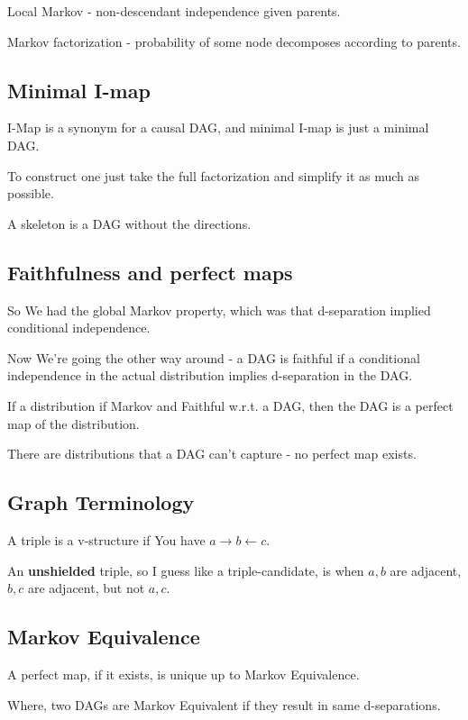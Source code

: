\documentclass{article}
\begin{document}
		Local Markov - non-descendant independence given parents.
		
		Markov factorization - probability of some node decomposes according to parents.
		
	\subsection{Minimal I-map}
	
		I-Map is a synonym for a causal DAG, and minimal I-map is just a minimal DAG.
		
		To construct one just take the full factorization and simplify it as much as possible.
		
		A skeleton is a DAG without the directions.
		
	\subsection{Faithfulness and perfect maps}
	
		So We had the global Markov property, which was that d-separation implied conditional independence.
		
		Now We're going the other way around - a DAG is faithful if a conditional independence in the actual distribution implies d-separation in the DAG.
		
		If a distribution if Markov and Faithful w.r.t. a DAG, then the DAG is a perfect map of the distribution.
		
		There are distributions that a DAG can't capture - no perfect map exists.
		
	\subsection{Graph Terminology}
	
		A triple is a v-structure if You have $a\to b \leftarrow c$.
		
		An \textbf{unshielded} triple, so I guess like a triple-candidate, is when $a, b$ are adjacent, $b, c$ are adjacent, but not $a, c$.
		
	\subsection{Markov Equivalence}
	
		A perfect map, if it exists, is unique up to Markov Equivalence.
		
		Where, two DAGs are Markov Equivalent if they result in same d-separations.
		
\end{document}
